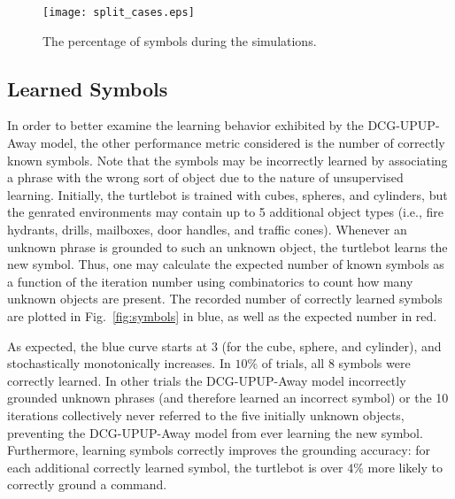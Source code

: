 \begin{figure}[h]
\centering
\texttt{[image: split\_cases.eps]}
\caption{The percentage of symbols during the simulations.}
\label{fig:g_acc_split}
\end{figure}




\subsection{Learned Symbols}
In order to better examine the learning behavior exhibited by the DCG-UPUP-Away model, the other performance metric considered is the number of correctly known symbols. Note that the symbols may be incorrectly learned by associating a phrase with the wrong sort of object due to the nature of unsupervised learning.
Initially, the turtlebot is trained with cubes, spheres, and cylinders, but the genrated environments may contain up to 5 additional object types (i.e., fire hydrants, drills, mailboxes, door handles, and traffic cones).
Whenever an unknown phrase is grounded to such an unknown object, the turtlebot learns the new symbol.
Thus, one may calculate the expected number of known symbols as a function of the iteration number using combinatorics to count how many unknown objects are present.
The recorded number of correctly learned symbols are plotted in Fig.~\ref{fig:symbols} in blue, as well as the expected number in red.

As expected, the blue curve starts at $3$ (for the cube, sphere, and cylinder), and stochastically monotonically increases.
In $10\%$ of trials, all $8$ symbols were correctly learned. In other trials the DCG-UPUP-Away model incorrectly grounded unknown phrases (and therefore learned an incorrect symbol) or the 10 iterations collectively never referred to the five initially unknown objects, preventing the DCG-UPUP-Away model from ever learning the new symbol.
Furthermore, learning symbols correctly improves the grounding accuracy: for each additional correctly learned symbol, the turtlebot is over $4\%$ more likely to correctly ground a command. %

